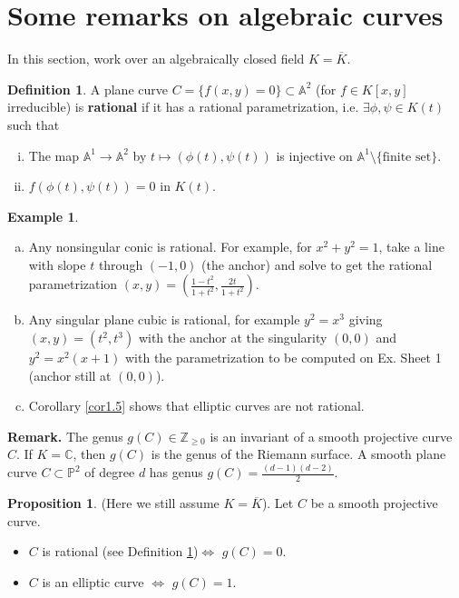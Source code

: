 \documentclass{article}
\theoremstyle{definition}
\newtheorem{prop}[theorem]{Proposition}
\newtheorem{example}[theorem]{Example}
\newtheorem{defn}{Definition}[section]
\begin{document}
\section{Some remarks on algebraic curves}


In this section, work over an algebraically closed field $K = \overline{K}$.

\begin{defn}\label{defn2.1}
    A plane curve $C = \{f(x,y) = 0\} \subset \mathbb{A}^2$ (for $f \in K[x,y]$ irreducible) is \textbf{rational} if it has a rational parametrization, i.e. $\exists \phi, \psi \in K(t)$ such that
    \begin{enumerate}[(i)]
        \item The map $\mathbb{A}^1 \to \mathbb{A}^2$ by $t \mapsto (\phi(t), \psi(t))$ is injective on $\mathbb{A}^1\setminus \{\text{finite set}\}$.
        \item $f(\phi(t),\psi(t))=0$ in $K(t)$.
    \end{enumerate}
\end{defn}
\begin{example}
    \begin{enumerate}[(a)]
        \item Any nonsingular conic is rational. For example, for $x^2+y^2=1$, take a line with slope $t$ through $(-1,0)$ (the anchor) and solve to get the rational parametrization $(x,y) = \left(\frac{1-t^2}{1+t^2},\frac{2t}{1+t^2}\right)$.
        \item Any singular plane cubic is rational, for example $y^2=x^3$ giving $(x,y) = (t^2, t^3)$ with the anchor at the singularity $(0,0)$ and $y^2 = x^2(x+1)$ with the parametrization to be computed on Ex. Sheet 1 (anchor still at $(0,0)$).
        \item Corollary \ref{cor1.5} shows that elliptic curves are not rational.
    \end{enumerate}
\end{example}
\textbf{Remark.}
The genus $g(C) \in \mathbb{Z}_{\ge 0}$ is an invariant of a smooth projective curve $C$. If $K=\mathbb{C}$, then $g(C)$ is the genus of the Riemann surface. A smooth plane curve $C \subset \mathbb{P}^2$ of degree $d$ has genus $g(C) = \frac{(d-1)(d-2)}{2}$.
\begin{prop}
    (Here we still assume $K = \overline{K}$). Let $C$ be a smooth projective curve.
    \begin{itemize}
        \item $C$ is rational (see Definition \ref{defn2.1})$\iff$ $g(C)=0$.
        \item $C$ is an elliptic curve $\iff$ $g(C)=1$.
    \end{itemize}
\end{prop}
\end{document}
